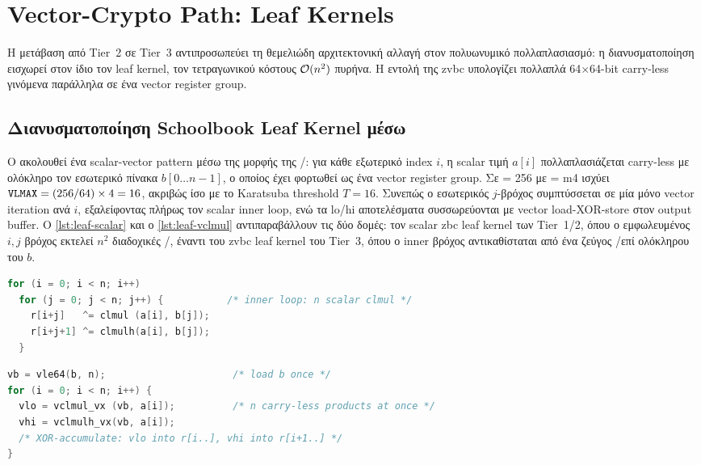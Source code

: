 \section{Vector-Crypto Path: \Zvbc Leaf Kernels}
\label{sec:polymul-zvbc}

Η μετάβαση από Tier~2 σε Tier~3 αντιπροσωπεύει τη θεμελιώδη αρχιτεκτονική
αλλαγή στον πολυωνυμικό πολλαπλασιασμό: η διανυσματοποίηση εισχωρεί στον
ίδιο τον leaf kernel, τον τετραγωνικού κόστους $\mathcal{O}(n^2)$ πυρήνα. Η εντολή \vclmul{} της \gls{zvbc}
υπολογίζει πολλαπλά \num{64}$\times$\num{64}-bit carry-less γινόμενα
παράλληλα σε ένα vector register group.

\subsection{Διανυσματοποίηση Schoolbook Leaf Kernel μέσω \vclmul}
\label{ssec:vclmul-leaf}

Ο  ακολουθεί ένα scalar-vector pattern μέσω της 
μορφής της \vclmul/\vclmulh: για κάθε εξωτερικό index $i$, η scalar τιμή $a[i]$
πολλαπλασιάζεται carry-less με ολόκληρο τον εσωτερικό πίνακα $b[0 \ldots n{-}1]$,
ο οποίος έχει φορτωθεί ως ένα vector register group. Σε \VLEN = \num{256} με
\LMUL = m4 ισχύει $\texttt{VLMAX} = (256/64) \times 4 = 16$, ακριβώς ίσο με το Karatsuba
threshold $T=16$. Συνεπώς ο εσωτερικός $j$-βρόχος συμπτύσσεται σε μία μόνο vector
iteration ανά $i$, εξαλείφοντας πλήρως τον scalar inner loop, ενώ τα lo/hi
αποτελέσματα συσσωρεύονται με vector load-XOR-store στον output buffer.
Ο \cref{lst:leaf-scalar} και ο \cref{lst:leaf-vclmul} αντιπαραβάλλουν τις δύο
δομές: τον scalar \gls{zbc} leaf kernel των Tier~1/2, όπου ο εμφωλευμένος $i,j$ βρόχος
εκτελεί $n^2$ διαδοχικές \clmul/\clmulh, έναντι του \gls{zvbc} leaf kernel του Tier~3,
όπου ο inner βρόχος αντικαθίσταται από ένα ζεύγος \vclmul/\vclmulh επί ολόκληρου
του $b$.

\begin{lstlisting}[language=C,caption={Scalar \Zbc{} leaf kernel (Tier~1/2): εμφωλευμένος $i,j$ βρόχος, $n^2$ scalar \clmul/\clmulh.},label={lst:leaf-scalar}]
for (i = 0; i < n; i++)
  for (j = 0; j < n; j++) {           /* inner loop: n scalar clmul */
    r[i+j]   ^= clmul (a[i], b[j]);
    r[i+j+1] ^= clmulh(a[i], b[j]);
  }
\end{lstlisting}

\begin{lstlisting}[language=C,caption={Vector \Zvbc{} leaf kernel (Tier~3): ο inner $j$-βρόχος συμπτύσσεται σε ένα ζεύγος \vclmul/\vclmulh ανά $i$.},label={lst:leaf-vclmul}]
vb = vle64(b, n);                      /* load b once */
for (i = 0; i < n; i++) {
  vlo = vclmul_vx (vb, a[i]);          /* n carry-less products at once */
  vhi = vclmulh_vx(vb, a[i]);
  /* XOR-accumulate: vlo into r[i..], vhi into r[i+1..] */
}
\end{lstlisting}

